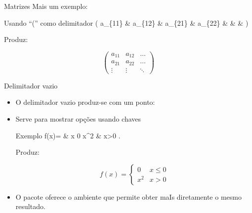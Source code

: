 \begin{frame}{Matrizes}
	Mais um exemplo:
	\pause
	\begin{Codigo}{Usando ``('' como delimitador}
		\LCmd{[} (
		\n
			a\string_\{11\} \& a\string_\{12\} \&  \LCmd{\bs}\n
			a\string_\{21\} \& a\string_\{22\} \&  \LCmd{\bs}\n
			\LCmd{vdots}  \&   \&           \n
		 ) \LCmd{]}
	\end{Codigo}

    \pause
	Produz:

	\begin{Resultado}{}
		\[ \left (
		\begin{array}{ccc}
			a_{11} & a_{12} & \ldots \\
			a_{21} & a_{22} & \ldots \\
			\vdots & \vdots & \ddots
		\end{array} \right ) \]
	\end{Resultado}
\end{frame}

\begin{frame}{Delimitador vazio}
	\begin{itemize}
		\item O delimitador vazio produz-se com um ponto: 
		\pause
		\item Serve para mostrar opções usando chaves
		    \pause

			\begin{Codigo}{Exemplo}
				f(x)=\LCmd{\lb}\n
				 \& x 0 \LCmd{\bs}\n
					x\string^2 \& x>0\n
				\n{}.
			\end{Codigo}

            \pause
			Produz:

			\begin{Resultado}{}
				\[
				f(x)=\left\{
				\begin{array}{ll}
					0 & x\leq 0 \\
					x^2 & x>0
				\end{array}\right.
				\]
			\end{Resultado}

        \pause
		\item O pacote  oferece o ambiente  que permite obter maIs diretamente o mesmo resultado.
	\end{itemize}
\end{frame}

